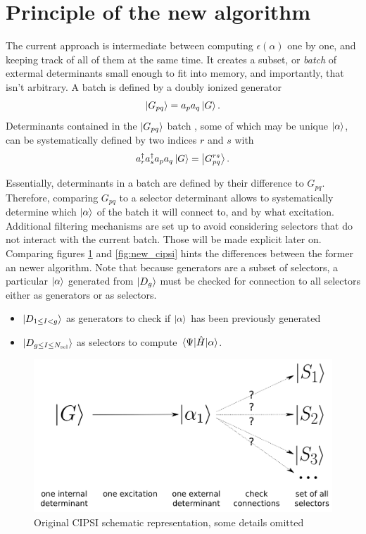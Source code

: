 \documentclass[./thesis.tex]{subfiles}
\newcommand{\Gpqrs}{\ket{G^{rs}_{pq}}}
\begin{document}
\section{Principle of the new algorithm}

The current approach is intermediate between computing $\epsilon(\alpha)$ one by one, and keeping track of all of them at the same time.
It creates a subset, or \emph{batch} of extermal determinants small enough to fit into memory, and importantly, that isn't arbitrary.
A batch is defined by a doubly ionized generator
\begin{equation}
\ket {G_{pq}} = a_p a_q \ket G.
\end{equation}
Determinants contained in the $\ket {G_{pq}}$ batch , some of which may be unique ${\ket{\alpha}}$, can be systematically defined by two indices $r$ and $s$ with
\begin{equation}
a^\dagger_r a^\dagger_s a_p a_q  \ket G = \Gpqrs.
\end{equation}

Essentially, determinants in a batch are defined by their difference to $G_{pq}$. Therefore, comparing $G_{pq}$ to a selector determinant allows to systematically determine which ${\ket{\alpha}}$ of the batch it will connect to, and by what excitation. Additional filtering mechanisms are set up to avoid considering selectors that do not interact with the current batch. Those will be made explicit later on. Comparing figures \ref{fig:old_cipsi} and \ref{fig:new_cipsi} hints the differences between the former an newer algorithm. Note that because generators are a subset of selectors, a particular ${\ket{\alpha}}$ generated from $\ket {D_g}$ must be checked for connection to all selectors either as generators or as selectors.

\begin{itemize}
\item
$\ket {D_{1 \le I < g}}$ as generators to check if ${\ket{\alpha}}$ has been previously generated
\item
$\ket {D_{g \le I \le {N_\text{sel}}}}$ as selectors to compute $\mel{\Psi}{\hat{H}}{\alpha}$.
\end{itemize}


\begin{figure}[h!]
	\begin{center}
		\includegraphics[width=0.7\columnwidth]{figures/cipsi/old_cipsi}
		\caption{Original CIPSI schematic representation, some details omitted}
		\label{fig:old_cipsi}
	\end{center}
\end{figure}
\end{document}
